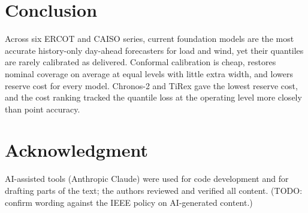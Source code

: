 \documentclass[conference]{IEEEtran}
\begin{document}
\section{Conclusion}
Across six ERCOT and CAISO series, current foundation models are the most accurate history-only day-ahead forecasters for load and wind, yet their quantiles are rarely calibrated as delivered. Conformal calibration is cheap, restores nominal coverage on average at equal levels with little extra width, and lowers reserve cost for every model. Chronos-2 and TiRex gave the lowest reserve cost, and the cost ranking tracked the quantile loss at the operating level more closely than point accuracy.

\section*{Acknowledgment}
AI-assisted tools (Anthropic Claude) were used for code development and for drafting parts of the text; the authors reviewed and verified all content. (TODO: confirm wording against the IEEE policy on AI-generated content.)



\end{document}

